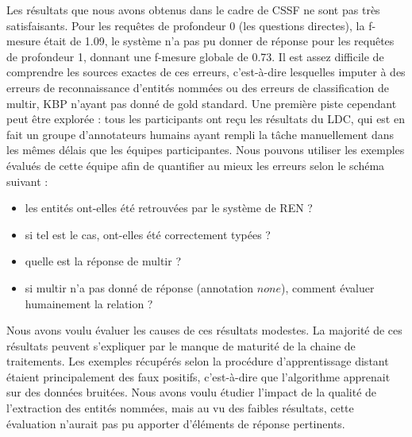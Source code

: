 \documentclass[PhD-Yoann-Dupont.tex]{subfiles}
\begin{document}
Les résultats que nous avons obtenus dans le cadre de CSSF ne sont pas très satisfaisants. Pour les requêtes de profondeur 0 (les questions directes), la f-mesure était de 1.09, le système n'a pas pu donner de réponse pour les requêtes de profondeur 1, donnant une f-mesure globale de 0.73. Il est assez difficile de comprendre les sources exactes de ces erreurs, c'est-à-dire lesquelles imputer à des erreurs de reconnaissance d'entités nommées ou des erreurs de classification de multir, KBP n'ayant pas donné de gold standard. Une première piste cependant peut être explorée : tous les participants ont reçu les résultats du LDC, qui est en fait un groupe d'annotateurs humains ayant rempli la tâche manuellement dans les mêmes délais que les équipes participantes. Nous pouvons utiliser les exemples évalués de cette équipe afin de quantifier au mieux les erreurs selon le schéma suivant :
\begin{itemize}
    \item les entités ont-elles été retrouvées par le système de REN ?
    \item si tel est le cas, ont-elles été correctement typées ?
    \item quelle est la réponse de multir ?
    \item si multir n'a pas donné de réponse (annotation $none$), comment évaluer humainement la relation ?
\end{itemize}


Nous avons voulu évaluer les causes de ces résultats modestes. La majorité de ces résultats peuvent s'expliquer par le manque de maturité de la chaine de traitements. Les exemples récupérés selon la procédure d'apprentissage distant étaient principalement des faux positifs, c'est-à-dire que l'algorithme apprenait sur des données bruitées. Nous avons voulu étudier l'impact de la qualité de l'extraction des entités nommées, mais au vu des faibles résultats, cette évaluation n'aurait pas pu apporter d'éléments de réponse pertinents.
\end{document}
